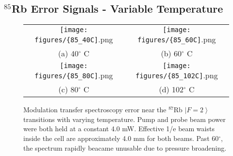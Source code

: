 \subsection{$^{85}$Rb Error Signals - Variable Temperature}
\label{app:85temp}

\begin{figure}[H]
  \begin{tabular}{cc}
    \texttt{[image: figures/\{85\_40C]}.png} &
    \texttt{[image: figures/\{85\_60C]}.png} \\
    (a) 40$^{\circ}$ C & (b) 60$^{\circ}$ C  \\[6pt]
    \texttt{[image: figures/\{85\_80C]}.png} &
    \texttt{[image: figures/\{85\_102C]}.png} \\
    (c) 80$^{\circ}$ C  & (d) 102$^{\circ}$ C  \\[6pt]
  \end{tabular}
  \caption{Modulation transfer spectroscopy error near the $^{87}$Rb $\left|F=2\right\rangle$ transitions with varying temperature. Pump and probe beam power were both held at a constant 4.0 mW. Effective 1/e beam waists inside the cell are approximately 4.0 mm for both beams. Past 60$^{\circ}$, the spectrum rapidly beacame unusable due to pressure broadening.}
\end{figure}
\newpage

